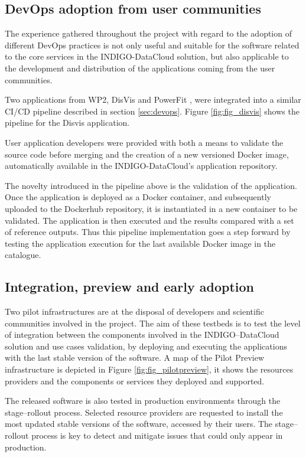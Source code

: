 \documentclass[journal]{IEEEtran}
\begin{document}
\subsection{DevOps adoption from user communities}

The experience gathered throughout the project with regard to the adoption of
different DevOps practices is not only useful and suitable for the software related
to the core services in the INDIGO-DataCloud solution, but also applicable to the
development and distribution of the applications coming from the user communities.

Two applications from WP2, DisVis \cite{disvis} and PowerFit \cite{powerfit}, were
integrated into a similar CI/CD pipeline described in section \ref{sec:devops}.
Figure \ref{fig:fig_disvis} shows the pipeline for the Disvis application.

User application developers were provided with both a means to validate the
source code before merging and the creation of a new versioned Docker image,
automatically available in the INDIGO-DataCloud’s application repository.

The novelty introduced in the pipeline above is the validation of the application.
Once the application is deployed as a Docker container, and subsequently uploaded
to the Dockerhub repository, it is instantiated in a new container to be validated.
The application is then executed and the results compared with a set of reference outputs.
Thus this pipeline implementation goes a step forward by testing the application
execution for the last available Docker image in the catalogue.

\subsection{Integration, preview and early adoption}

Two pilot infrastructures are at the disposal of developers and scientific
communities involved in the project. The aim of these testbeds is to test the
level of integration between the components involved in the INDIGO--DataCloud
solution and use cases validation, by deploying and executing the applications
with the last stable version of the software. A map of the Pilot Preview
infrastructure is depicted in Figure \ref{fig:fig_pilotpreview}, it shows the
resources providers and the components or services they deployed and supported.


The released software is also tested in production environments through the
stage--rollout process. Selected resource providers are requested to install
the most updated stable versions of the software, accessed by their users. The
stage--rollout process is key to detect and mitigate issues that could only
appear in production.
\end{document}
